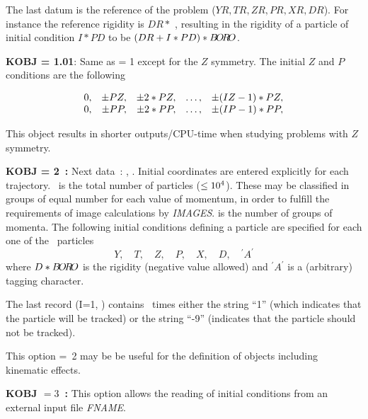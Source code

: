 \noindent The last datum is the reference of the problem ($YR,TR,ZR,PR,XR,DR$). 
For instance the reference rigidity is $ DR \ast$ \BORO, resulting 
 in the rigidity of a particle of initial condition $ I\ast PD $ to be 
$ (DR+I\ast PD)\ast B\!O\!R\!O$. 

\bigskip

\noindent\textbf{KOBJ = 1.01}: Same as \KOBJ = 1    except for the $ Z $
symmetry.  The initial 
$ Z $ and $ P $ conditions are the following 

$$
  \begin{array}{*{5}{r<{,}}}
	  0  &  \pm PZ &   \pm 2  \ast   PZ & \ldots & \pm (IZ-1)   \ast   PZ \\
	  0  &  \pm PP &   \pm 2 \ast   PP  & \ldots &  \pm (IP-1)  \ast   PP 
  \end{array}
 $$


\noindent This object results in shorter outputs/CPU-time when studying problems with $Z $ symmetry.  

\bigskip

\noindent\textbf{KOBJ = 2~:}  Next data~: \IMAX{},  
\IDMAX{}. Initial coordinates
are entered explicitly for each 
trajectory.  \IMAX\  is the total number of particles (\IMAX$\leq 10^4$).  
These may be classified in groups of equal number for each value of momentum, in order to 
fulfill the requirements of image calculations by \textsl{IMAGES}. 
 \IDMAX{} is the 
number of groups of momenta.  The  following initial 
conditions defining a particle are specified for each one of the \IMAX\  
 particles
 $$ Y,\quad T,\quad Z,\quad P, \quad X, \quad D,\quad ^\prime A^\prime $$
%
 where $ D\ast B\!O\!R\!O$ is the rigidity (negative value   
 allowed) and $ ^\prime A^\prime $ is a
(arbitrary) tagging character.  


\noindent The last record \IEX{} (I=1, \IMAX)  contains 
\IMAX\  times either the string ``1'' (which indicates that the particle will be
tracked) or the string ``\mbox{-9}''  (indicates that the particle should not be tracked).  

\noindent This option \mbox{\KOBJ= 2}   may be be useful for the
definition of objects including kinematic  effects.  
\bigskip


\newpage 


\noindent\textbf{KOBJ $= 3$~:} This option allows the reading of initial conditions from an
external input file \textsl{FNAME}.  

